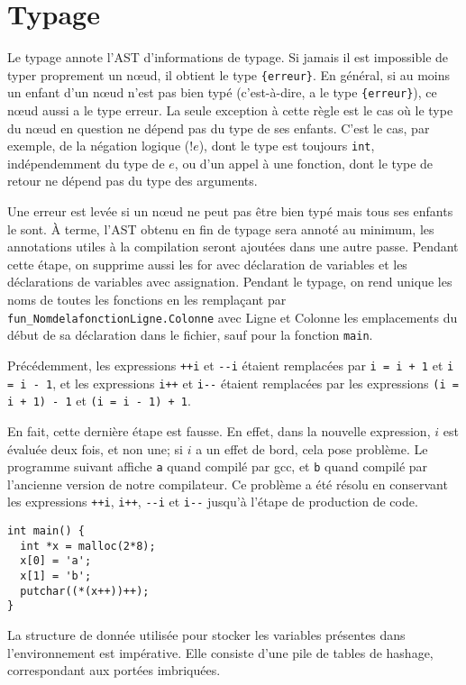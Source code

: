 \documentclass{scrartcl}
\begin{document}
\section*{Typage}
Le typage annote l'AST d'informations de typage. Si jamais il est impossible
de typer proprement un n\oe{}ud, il obtient le type \verb|{erreur}|. En général,
si au moins un enfant d'un n\oe{}ud n'est pas bien typé (c'est-à-dire, a le type
\verb|{erreur}|), ce n\oe{}ud aussi a le type erreur. La seule exception à cette règle
est le cas où le type du n\oe{}ud en question ne dépend pas du type de ses enfants.
C'est le cas, par exemple, de la négation logique ($!e$), dont le type est
toujours \verb|int|, indépendemment du type de $e$, ou d'un appel à une fonction,
dont le type de retour ne dépend pas du type des arguments.\par
Une erreur est levée si un n\oe{}ud ne peut pas être bien typé mais tous ses enfants
le sont. À terme, l'AST obtenu en fin de typage sera annoté au minimum, les annotations
utiles à la compilation seront ajoutées dans une autre passe. Pendant cette étape,
on supprime aussi les for avec déclaration de variables et les déclarations de variables
avec assignation. Pendant le typage, on rend unique les noms de toutes
les fonctions en les remplaçant par \verb|fun_NomdelafonctionLigne.Colonne| avec Ligne et Colonne les
emplacements du début de sa déclaration dans le fichier, sauf pour la fonction \verb|main|.

Précédemment, les expressions \verb|++i| et \verb|--i|
étaient remplacées par \verb|i = i + 1| et \verb|i = i - 1|, et les expressions \verb|i++| et \verb|i--| étaient remplacées
par les expressions \verb|(i = i + 1) - 1| et \verb|(i = i - 1) + 1|.\par
En fait, cette dernière étape est fausse. En effet, dans la nouvelle expression,
\(i\) est évaluée deux fois, et non une; si \(i\) a un effet de bord, cela pose
problème. Le programme suivant affiche \verb|a| quand compilé par gcc, et
\verb|b| quand compilé par l'ancienne version de notre compilateur. Ce problème a été résolu
en conservant les expressions \verb|++i|, \verb|i++|, \verb|--i| et \verb|i--| jusqu'à l'étape de production de code.
\begin{verbatim}
int main() {
  int *x = malloc(2*8);
  x[0] = 'a';
  x[1] = 'b';
  putchar((*(x++))++);
}
\end{verbatim}
\par
La structure de donnée utilisée pour stocker les variables présentes dans
l'environnement est impérative. Elle consiste d'une pile de tables de hashage,
correspondant aux portées imbriquées.
\end{document}
